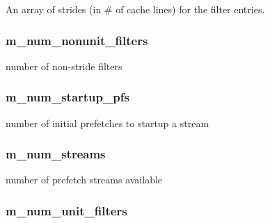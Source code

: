 An array of strides (in \# of cache lines) for the filter entries. \hypertarget{classPrefetcher_ad6f212487f4bbedaa6d22125da88fa04}{
\subsubsection[{m\_\-num\_\-nonunit\_\-filters}]{ {\bf m\_\-num\_\-nonunit\_\-filters}}}
\label{classPrefetcher_ad6f212487f4bbedaa6d22125da88fa04}


number of non-\/stride filters \hypertarget{classPrefetcher_a0a4656906ae582dc063cb6d703f1c3d6}{
\subsubsection[{m\_\-num\_\-startup\_\-pfs}]{ {\bf m\_\-num\_\-startup\_\-pfs}}}
\label{classPrefetcher_a0a4656906ae582dc063cb6d703f1c3d6}


number of initial prefetches to startup a stream \hypertarget{classPrefetcher_af24cc9f3fcde8ff672f65b91689b1c9c}{
\subsubsection[{m\_\-num\_\-streams}]{ {\bf m\_\-num\_\-streams}}}
\label{classPrefetcher_af24cc9f3fcde8ff672f65b91689b1c9c}


number of prefetch streams available \hypertarget{classPrefetcher_a05a4b7a047922b33e9ce39b879a2ae6b}{
\subsubsection[{m\_\-num\_\-unit\_\-filters}]{ {\bf m\_\-num\_\-unit\_\-filters}}}
\label{classPrefetcher_a05a4b7a047922b33e9ce39b879a2ae6b}


